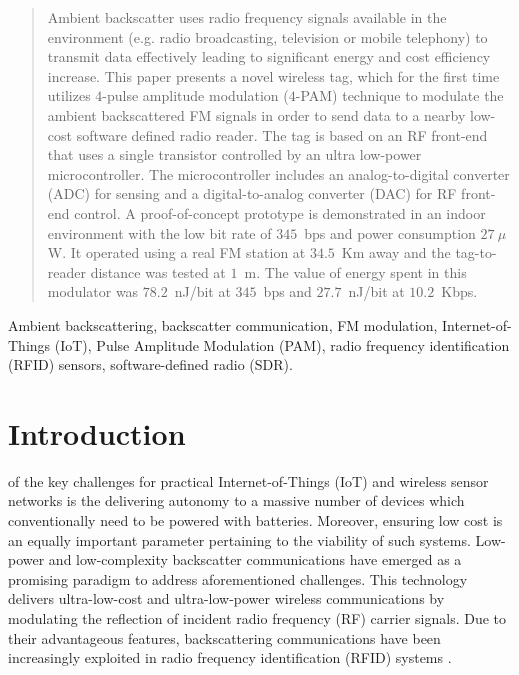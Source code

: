 \documentclass[journal]{IEEEtran}
\begin{document}
\begin{abstract}
%

Ambient backscatter uses radio frequency signals available in the environment (e.g. radio broadcasting, television or mobile telephony) to transmit data effectively leading to significant  energy and cost efficiency increase. 
%
This paper presents a novel wireless tag, which for the first time utilizes  $4$-pulse amplitude modulation ($4$-PAM) technique
to modulate the  ambient  backscattered   FM signals
in order to send data to a nearby low-cost software defined radio reader.
%
The tag is based on an RF front-end that uses a single transistor controlled by an ultra low-power microcontroller.
%
The microcontroller includes an analog-to-digital converter (ADC) for sensing and a digital-to-analog converter (DAC) for RF front-end control.  
%
A proof-of-concept prototype is demonstrated in an indoor environment with the low bit rate of  $345$~bps and  power consumption $27~\mu$W. 
%
It operated using a real FM station at $34.5$~Km away and the tag-to-reader distance was tested at $1$~m.
%
The value of energy spent in this modulator was $78.2$~nJ/bit at $345$~bps and $27.7$~nJ/bit at $10.2$~Kbps.
%

\end{abstract}
\begin{IEEEkeywords}
Ambient backscattering, backscatter communication, FM modulation, Internet-of-Things (IoT), Pulse Amplitude Modulation (PAM), radio frequency  identification (RFID) sensors, software-defined radio (SDR). 
\end{IEEEkeywords}




\IEEEpeerreviewmaketitle



\section{Introduction}
%
%
 of the key challenges for  practical Internet-of-Things (IoT) and wireless sensor networks is the delivering autonomy to a massive number of devices which conventionally need to be powered with batteries. 
%
Moreover, ensuring low cost is an equally important  parameter pertaining to the viability of such systems.
%
Low-power and low-complexity backscatter communications have emerged as a promising paradigm to address aforementioned challenges. 
%
This technology delivers ultra-low-cost and ultra-low-power wireless communications by modulating the reflection of  incident radio frequency (RF) carrier signals.
%
Due to their advantageous features, backscattering communications
have been increasingly exploited in radio frequency identification (RFID) systems \cite{EPCRFID}.
\end{document}
